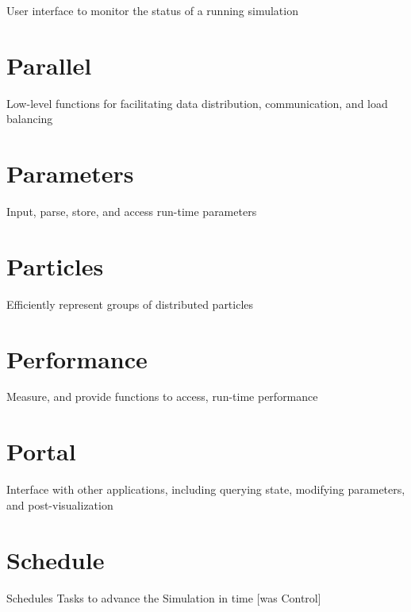 \documentclass{book}
\begin{document}
User interface to monitor the status of a running simulation

\section{Parallel}

Low-level functions for facilitating data distribution, communication,
and load balancing

\section{Parameters}

Input, parse, store, and access run-time parameters

\section{Particles}

Efficiently represent groups of distributed particles

\section{Performance}

Measure, and provide functions to access, run-time performance

\section{Portal}

Interface with other applications, including querying state, modifying
parameters, and post-visualization

\section{Schedule}
Schedules Tasks to advance the Simulation in time [was Control]
\end{document}
